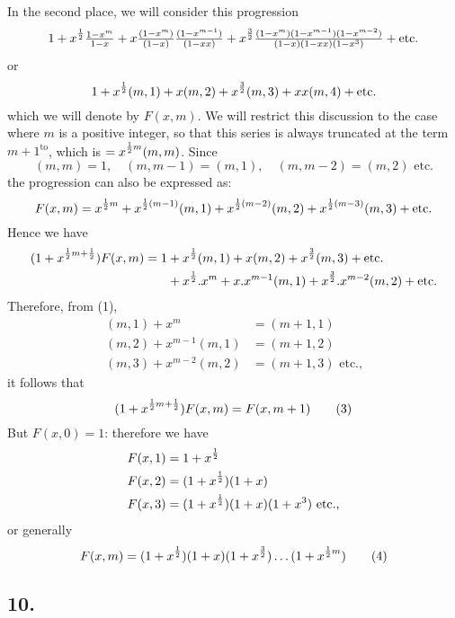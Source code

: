 \documentclass[twoside,12pt, showframe]{memoir}
\let\oldfrac\frac
\def\frac#1#2{\mathchoice{\tfrac{#1}{#2}}{\oldfrac{#1}{#2}}{\genfrac{}{}{}{2}{#1}{#2\mathstrut}}{\genfrac{}{}{}{3}{#1}{#2\mathstrut}}}
\begin{document}
In the second place, we will consider this progression
\[1+x^{\frac{1}{2}} \frac{1-x^{m}}{1-x}+x \frac{(1-x^{m})}{(1-x)} \frac{(1-x^{m-1})}{(1-x x)}+x^{\frac{3}{2}} \frac{(1-x^{m})(1-x^{m-1})(1-x^{m-2})}{(1-x)(1-x x)(1-x^{3})}+\text{etc.}\]
or
\[1+x^{\frac{1}{2}}(m, 1)+x(m, 2)+x^{\frac{3}{2}}(m, 3)+x x(m, 4)+\text{etc.}\]
which we will denote by \({F}(x, m)\). We will restrict this discussion to the case where \(m\) is a positive integer, so that this series is always truncated at the term \(m+1^{\text{to}}\), which is \(=x^{\frac{1}{2} m}(m, m)\). Since
\[(m, m)=1, \quad(m, m-1)=(m, 1), \quad(m, m-2)=(m, 2) \text{ etc.}\]
the progression can also be expressed as:
\[F(x, m)=x^{\frac{1}{2} m}+x^{\frac{1}{2}(m-1)}(m, 1)+x^{\frac{1}{2}(m-2)}(m, 2)+x^{\frac{1}{2}(m-3)}(m, 3)+\text{etc.}\]
Hence we have
\[\begin{aligned}
(1+x^{\frac{1}{2} m+\frac{1}{2}}) F(x, m) =1&+x^{\frac{1}{2}}(m, 1)+x(m, 2)+x^{\frac{3}{2}}(m, 3)+\text{etc.} \\
& +x^{\frac{1}{2}} . x^{m}+x . x^{m-1}(m, 1)+x^{\frac{3}{2}} . x^{m-2}(m, 2)+\text{etc.}
\end{aligned}\]
Therefore, from (1),
\[\begin{aligned}
(m, 1)+x^{m} & =(m+1,1) \\
(m, 2)+x^{m-1}(m, 1) & =(m+1,2) \\
(m, 3)+x^{m-2}(m, 2) & =(m+1,3) \text{ etc.,}
\end{aligned}\]
it follows that
\[(1+x^{\frac{1}{2} m+\frac{1}{2}}) F(x, m)=F(x, m+1)\tag{3}\]
But \(F(x, 0)=1\): therefore we have
\[\begin{aligned}
& F(x, 1)=1+x^{\frac{1}{2}} \\
& F(x, 2)=(1+x^{\frac{1}{2}})(1+x) \\
& F(x, 3)=(1+x^{\frac{1}{2}})(1+x)(1+x^{3}) \text{ etc.,}
\end{aligned}\]
or generally
\[F(x, m)=(1+x^{\frac{1}{2}})(1+x)(1+x^{\frac{3}{2}}) \ldots(1+x^{\frac{1}{2} m})\tag{4}\]
%

\subsection*{10.}
\end{document}
